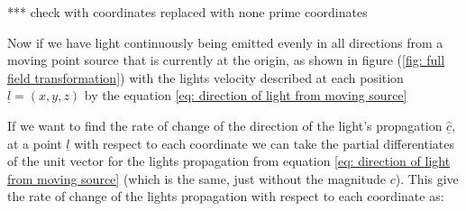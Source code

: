 *** check with coordinates replaced with none prime coordinates

Now if we have light continuously being emitted evenly in all directions from a moving point source that is currently at the origin, as shown in figure (\ref{fig: full field transformation}) with the lights velocity described at each position $\underline{l}=(x,y,z)$ by the equation \eqref{eq: direction of light from moving source}

If we want to find the rate of change of the direction of the light's propagation $\underline{\hat{c}}$, at a point $\underline{l}$ with respect to each coordinate we can take the partial differentiates of the unit vector for the lights propagation from equation \eqref{eq: direction of light from moving source} (which is the same, just without the magnitude $c$).
This give the rate of change of the lights propagation with respect to each coordinate as:

